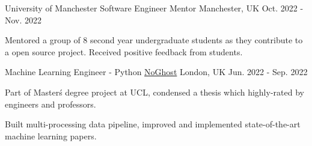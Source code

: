 

\begin{cventries}


\cventry
      {University of Manchester} %
      {Software Engineer Mentor} %
      {Manchester, UK} %
      {Oct. 2022 - Nov. 2022} %
      {
        \begin{cvitems} %
          \item {Mentored a group of 8 second year undergraduate students as they contribute to a open source project. Received positive feedback from students.}
        \end{cvitems}
      }

\cventry
      {Machine Learning Engineer - Python} %
      {\href{https://www.noghost.co.uk/}{NoGhost}} %
      {London, UK} %
      {Jun. 2022 - Sep. 2022} %
      {
        \begin{cvitems} %
          \item {Part of Master\'s degree project at UCL, condensed a thesis which highly-rated by engineers and professors.}
          \item {Built multi-processing data pipeline, improved and implemented state-of-the-art machine learning papers.}
        \end{cvitems}
      }


\end{cventries}
